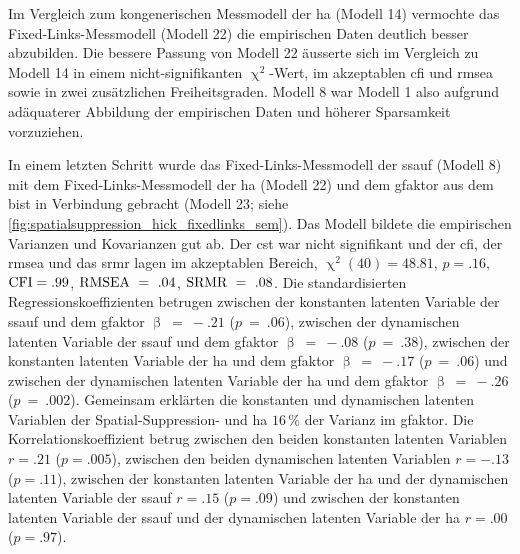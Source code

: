 \documentclass[11pt, twoside, a4paper]{book}		%
\begin{document}
Im Vergleich zum kongenerischen Messmodell der \gls{ha} (Modell 14) vermochte das Fixed-Links-Messmodell (Modell 22) die empirischen Daten deutlich besser abzubilden. Die bessere Passung von Modell 22 äusserte sich im Vergleich zu Modell 14 in einem nicht-signifikanten $\upchi^2$-Wert, im akzeptablen \gls{cfi} und \gls{rmsea} sowie in zwei zusätzlichen Freiheitsgraden. Modell 8 war Modell 1 also aufgrund adäquaterer Abbildung der empirischen Daten und höherer Sparsamkeit vorzuziehen.

In einem letzten Schritt wurde das Fixed-Links-Messmodell der \gls{ssauf} (Modell 8) mit dem Fixed-Links-Messmodell der \gls{ha} (Modell 22) und dem \gls{gfaktor} aus dem \gls{bist} in Verbindung gebracht (Modell 23; siehe \autoref{fig:spatialsuppression_hick_fixedlinks_sem}). Das Modell bildete die empirischen Varianzen und Kovarianzen gut ab. Der \gls{cst} war nicht signifikant und der \gls{cfi}, der \gls{rmsea} und das \gls{srmr} lagen im akzeptablen Bereich, $\upchi^2(40)=48.81$, $p=.16$, $\textnormal{CFI}=.99$, $\textnormal{RMSEA}~=~.04$, $\textnormal{SRMR}~=~.08$. 
Die standardisierten Regressionskoeffizienten betrugen zwischen der konstanten latenten Variable der \gls{ssauf} und dem \gls{gfaktor} $\upbeta~=~-.21$ ($p~=~.06$), zwischen der dynamischen latenten Variable der \gls{ssauf} und dem \gls{gfaktor} $\upbeta~=~-.08$ ($p~=~.38$), zwischen der konstanten latenten Variable der \gls{ha} und dem \gls{gfaktor} $\upbeta~=~-.17$ ($p~=~.06$) und zwischen der dynamischen latenten Variable der \gls{ha} und dem \gls{gfaktor} $\upbeta~=~-.26$ ($p~=~.002$). Gemeinsam erklärten die konstanten und dynamischen latenten Variablen der Spatial-Suppression- und \gls{ha} $16\,\%$ der Varianz im \gls{gfaktor}. Die Korrelationskoeffizient betrug zwischen den beiden konstanten latenten Variablen $r=.21$ ($p=.005$), zwischen den beiden dynamischen latenten Variablen $r=-.13$ ($p=.11$), zwischen der konstanten latenten Variable der \gls{ha} und der dynamischen latenten Variable der \gls{ssauf} $r=.15$ ($p=.09$) und zwischen der konstanten latenten Variable der \gls{ssauf} und der dynamischen latenten Variable der \gls{ha} $r=.00$ ($p=.97$).
\end{document}
